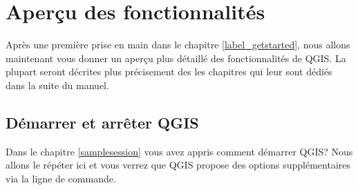 
\section{Aper\c{c}u des fonctionnalit\'es}\label{feature_glance}



Apr\`es une premi\`ere prise en main dans le chapitre \ref{label_getstarted}, nous allons maintenant vous donner un aper\c{c}u plus d\'etaill\'e des fonctionnalit\'es de QGIS. La plupart seront d\'ecrites plus pr\'ecisement des les chapitres qui leur sont d\'edi\'es dans la suite du manuel.

%

\subsection{D\'emarrer et arr\^eter QGIS}\label{label_startinqgis}

Dans le chapitre \ref{samplesession} vous avez appris comment d\'emarrer QGIS? Nous allons le r\'ep\'eter ici et vous verrez que QGIS propose des options suppl\'ementaires via la ligne de commande.


